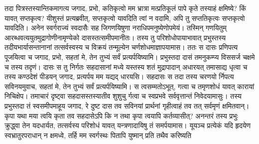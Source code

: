 \vakya तदा पित्रस्तस्यान्तिकमागत्य जगाद, प्रभो, कतिकृत्वो मम भ्रात्रा मत्प्रतिकूलं पापे कृते तस्याहं क्षमिष्ये? किं यावत् सप्तकृत्व?
\vakya यीशुस्तं प्रत्यब्रवीत्, सप्तकृत्वो यावदिति त्वां न वदामि, अपि तु सप्ततिकृत्वः सप्तकृत्वो यावदिति।
\vakya अनेन स्वर्गराज्यं स्वदासैः सह जिगणयिषुणा नराधिपमनुष्येणोपमेयं।
\vakya तस्मिन् गणयितुम् आरब्धवत्ययुतमुद्रागोणीनामृण्येको दासस्तत्समीपमानीतः।
\vakya तस्य तु परिशोधोपायाभावात् प्रभुस्तस्य तदीयभार्यासन्तानानां तत्सर्वस्वस्य च विक्रयं तन्मूल्येन चर्णशोधमाज्ञापयामास।
\vakya ततः स दासः प्रणिपत्य पूजयित्वा च जगाद, प्रभो, सहतां मे, तेन तुभ्यं सर्वं प्रत्यर्पयिष्यामि।
\vakya प्रभुस्तदा दासं तमनुकम्प्य विससर्ज चक्षमे च तस्य तदृणं।
\vakya दासः स तु निर्गतः सहदासानां मध्ये यस्तस्य शतं मुद्रापादान् अधारयत् तमासाद्य धृत्वा च तस्य कण्ठदेशं पीडयन् जगाद, प्रत्यर्पय मम यद्यद् धारयसि।
\vakya सहदासः स तदा तस्य चरणयो र्निपत्य सविनयमुवाच, सहतां मे, तेन तुभ्यं सर्वं प्रत्यर्पयिष्यामि।
\vakya स त्वसम्मतोऽभूत्, गत्वा च तमृणशोधं यावत् कारायां निचिक्षेप।
\vakya तमाचारं दृष्ट्वा सहदासस्तस्यातीव शुशुचु र्गत्वा च स्वप्रभवे सर्ववृत्तान्तं निवेदयामासुः।
\vakya तस्य प्रभुस्तदा तं स्वसमीपमाहूय जगाद, रे दुष्ट दास तव सविनयां प्रार्थनां गृहीत्वाहं तव तत् सर्वमृणं क्षमितवान्।
\vakya कृपा यथा मया त्वयि कृता तव सहदासेऽपि कि न तथा कृपा त्वयापि कर्तव्यासीत्?
\vakya अनन्तरं तस्य प्रभुः क्रुद्ध्वा तेन यदधार्यत, तत्सर्वस्य परिशोधं यावत् यन्त्रणादायिषु तं समर्पयामास।
\vakya यूयञ्च प्रत्येकं यदि हृदयेण स्वभ्रातुरपराधान् न क्षमध्वे, तर्हि मम स्वर्गस्थः पितापि युष्मान् प्रति तथैव करिष्यति\eoc